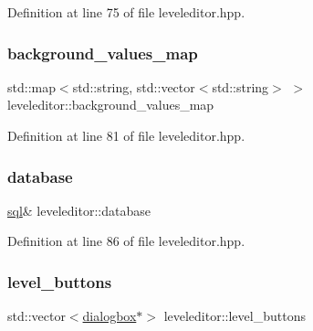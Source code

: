 Definition at line 75 of file leveleditor.\+hpp.

\mbox{\label{classleveleditor_a36fa2dbff8ca9dfddb8ff3b6b331e275}} 
\subsubsection{\texorpdfstring{background\+\_\+values\+\_\+map}{background\_values\_map}}
{\footnotesize\ttfamily std\+::map$<$std\+::string, std\+::vector$<$std\+::string$>$ $>$ leveleditor\+::background\+\_\+values\+\_\+map\hspace{0.3cm}{\ttfamily [private]}}



Definition at line 81 of file leveleditor.\+hpp.

\mbox{\label{classleveleditor_a1b1594767de698a60f38e91690a55a36}} 
\subsubsection{\texorpdfstring{database}{database}}
{\footnotesize\ttfamily \hyperlink{classsql}{sql}\& leveleditor\+::database\hspace{0.3cm}{\ttfamily [private]}}



Definition at line 86 of file leveleditor.\+hpp.

\mbox{\label{classleveleditor_a03a8753b5312938d83c67b0873014f6e}} 
\subsubsection{\texorpdfstring{level\+\_\+buttons}{level\_buttons}}
{\footnotesize\ttfamily std\+::vector$<$\hyperlink{classdialogbox}{dialogbox}$\ast$$>$ leveleditor\+::level\+\_\+buttons\hspace{0.3cm}{\ttfamily [private]}}




